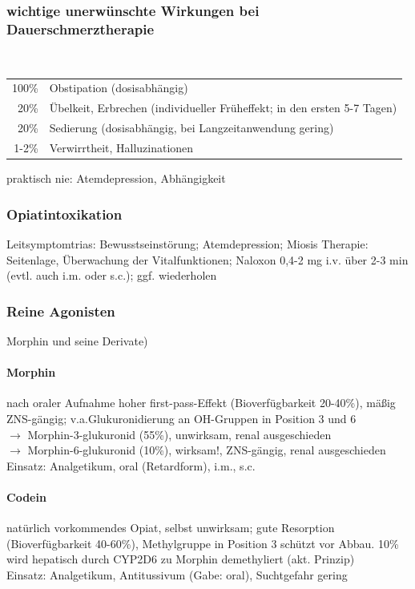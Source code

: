\documentclass[10pt,a4paper]{report}
\begin{document}
\subsubsection{wichtige unerwünschte Wirkungen bei Dauerschmerztherapie} %
\mbox{} \\
\label{par:wichtige_unerw_nschte_wirkungen_bei_dauerschmerztherapie}
\begin{tabularx}{\textwidth}{rX}
100\%&Obstipation (dosisabhängig)\\
20\%&Übelkeit, Erbrechen (individueller Früheffekt; in den ersten 5-7 Tagen)\\
20\%&Sedierung	(dosisabhängig, bei Langzeitanwendung gering) \\
1-2\%&Verwirrtheit, Halluzinationen\\
\end{tabularx}
praktisch nie: Atemdepression, Abhängigkeit
\subsubsection{Opiatintoxikation} %
\label{par:opiatintoxikation}
Leitsymptomtrias: Bewusstseinstörung; Atemdepression; Miosis
Therapie: Seitenlage, Überwachung der Vitalfunktionen; Naloxon 0,4-2 mg i.v. über 2-3 min (evtl. auch i.m. oder s.c.); ggf. wiederholen
\subsubsection{Reine Agonisten} %
\label{par:reine_agonisten}
Morphin und seine Derivate)
\paragraph{Morphin} %
\label{subp:morphin}
nach oraler Aufnahme hoher first-pass-Effekt (Bioverfügbarkeit 20-40\%), mäßig ZNS-gängig; v.a.Glukuronidierung an OH-Gruppen in Position 3 und 6\\
$\rightarrow$ Morphin-3-glukuronid (55\%), unwirksam, renal ausgeschieden\\
$\rightarrow$ Morphin-6-glukuronid (10\%), wirksam!, ZNS-gängig, renal  ausgeschieden \\
Einsatz: Analgetikum, oral (Retardform), i.m., s.c. 
\paragraph{Codein} %
\label{subp:codein}
natürlich vorkommendes Opiat, selbst unwirksam; gute Resorption (Bioverfügbarkeit 40-60\%), Methylgruppe in Position 3 schützt vor Abbau. 10\% wird hepatisch durch CYP2D6 zu Morphin demethyliert (akt. Prinzip)\\
Einsatz: Analgetikum, Antitussivum (Gabe: oral), Suchtgefahr gering
\end{document}
